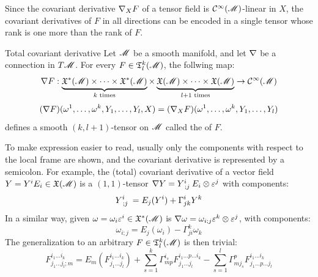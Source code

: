 Since the covariant derivative $ \nabla_X F $ of a tensor field is $ \mathcal{C}^{\infty}(\mathscr{M}) $-linear in $ X $, the covariant derivatives of $ F $ in all directions can be encoded in a single tensor whose rank is one more than the rank of $ F $.

\begin{proposition}{Total covariant derivative}{}
  Let $ \mathscr{M} $ be a smooth manifold, and let $ \nabla $ be a connection in $ T\mathscr{M} $. For every $ F \in \mathfrak{T}^{k}_{l}(\mathscr{M}) $, the follwing map:
  \begin{equation*}
    \nabla F : \underbrace{\mathfrak{X}^*(\mathscr{M}) \times \dots \times \mathfrak{X}^*(\mathscr{M})}_{k \text{ times}} \times \underbrace{\mathfrak{X}(\mathscr{M}) \times \dots \times \mathfrak{X}(\mathscr{M})}_{l+1 \text{ times}} \rightarrow \mathcal{C}^{\infty}(\mathscr{M})
  \end{equation*}
  \begin{equation*}
    (\nabla F) (\omega^1 , \dots , \omega^k , Y_1 , \dots , Y_l , X) = (\nabla_X F) (\omega^1 , \dots , \omega^k , Y_1 , \dots , Y_l)
  \end{equation*}
  defines a smooth $ (k , l+1) $-tensor on $ \mathscr{M} $ called the  of $ F $.
\end{proposition}

To make expression easier to read, usually only the components with respect to the local frame are shown, and the covariant derivative is represented by a semicolon. For example, the (total) covariant derivative of a vector field $ Y = Y^i E_i \in \mathfrak{X}(\mathscr{M}) $ is a $ (1,1) $-tensor $ \na Y = \tensor{Y}{^i_{;j}} E_i \otimes \varepsilon^j $ with components:
\begin{equation}
  \tensor{Y}{^i_{;j}} = E_j(Y^i) + \Gamma^i_{jk} Y^k
  \label{eq:covariant-derivative-vector-comp}
\end{equation}
In a similar way, given $ \omega = \omega_i \varepsilon^i \in \mathfrak{X}^*(\mathscr{M}) $ is $ \nabla \omega = \omega_{i;j} \varepsilon^k \otimes \varepsilon^j $, with components:
\begin{equation}
  \omega_{i;j} = E_j(\omega_i) - \Gamma^k_{ji} \omega_k
  \label{eq:covariant-derivative-covector-comp}
\end{equation}
The generalization to an arbitrary $ F \in \mathfrak{T}^{k}_{l}(\mathscr{M}) $ is then trivial:
\begin{equation}
  F^{i_1 \dots i_k}_{j_1 \dots j_l ; m} = E_m (F^{i_1 \dots i_k}_{j_1 \dots j_l}) + \sum_{s = 1}^k \Gamma^{i_s}_{mp} F^{i_1 \dots p \dots i_k}_{j_1 \dots j_l} - \sum_{s = 1}^l \Gamma^p_{m j_s} F^{i_1 \dots i_k}_{j_1 \dots p \dots j_l}
  \label{eq:covariant-derivative-tensor-comp}
\end{equation}


































